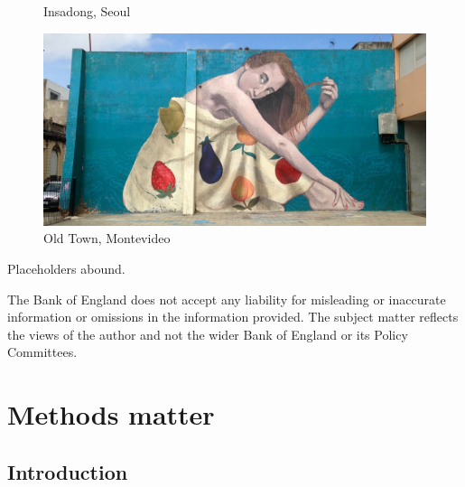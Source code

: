 \documentclass[
  letterpaper,
]{book}
\begin{document}
\begin{figure}
\begin{minipage}[t]{0.50\linewidth}
{{}

\caption{Insadong, Seoul}

}

\end{minipage}%

\end{figure}

\begin{figure}

{\centering \includegraphics{Montevideo.jpg}

}

\caption{Old Town, Montevideo}

\end{figure}

Placeholders abound.

\begin{tcolorbox}[enhanced jigsaw, opacityback=0, rightrule=.15mm, colback=white, toptitle=1mm, title=\textcolor{quarto-callout-note-color}{\faInfo}\hspace{0.5em}{Disclaimer}, coltitle=black, arc=.35mm, leftrule=.75mm, breakable, titlerule=0mm, bottomtitle=1mm, colbacktitle=quarto-callout-note-color!10!white, bottomrule=.15mm, toprule=.15mm, opacitybacktitle=0.6, left=2mm, colframe=quarto-callout-note-color-frame]

The Bank of England does not accept any liability for misleading or
inaccurate information or omissions in the information provided. The
subject matter reflects the views of the author and not the wider Bank
of England or its Policy Committees.

\end{tcolorbox}

\part{Methods matter}

\hypertarget{introduction}{%
\chapter{Introduction}\label{introduction}}
\end{document}
